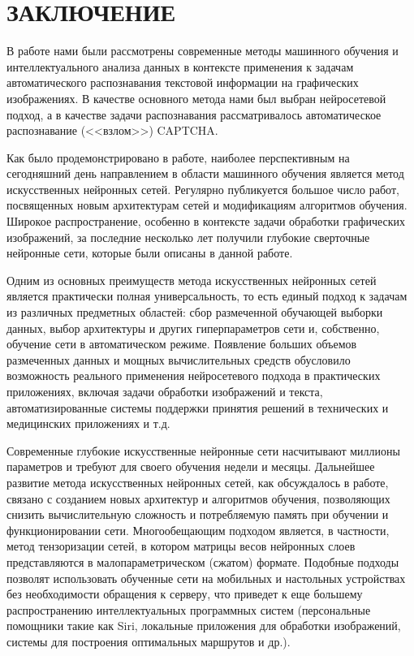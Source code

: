 \documentclass[a4paper,12pt,russian]{article} %
\begin{document}
\newpage
\section*{ЗАКЛЮЧЕНИЕ}

В работе нами были рассмотрены современные методы машинного обучения и интеллектуального анализа данных в контексте применения к задачам автоматического распознавания текстовой информации на графических изображениях.
В качестве основного метода нами был выбран нейросетевой подход, а в качестве задачи распознавания рассматривалось автоматическое распознавание (<<взлом>>) CAPTCHA.

Как было продемонстрировано в работе, наиболее перспективным на сегодняшний день направлением в области машинного обучения является метод искусственных нейронных сетей.
Регулярно публикуется большое число работ, посвященных новым архитектурам сетей и модификациям алгоритмов обучения.
Широкое распространение, особенно в контексте задачи обработки графических изображений, за последние несколько лет получили глубокие сверточные нейронные сети, которые были описаны в данной работе.

Одним из основных преимуществ метода искусственных нейронных сетей является практически полная универсальность, то есть единый подход к задачам из различных предметных областей: сбор размеченной обучающей выборки данных, выбор архитектуры и других гиперпараметров сети и, собственно, обучение сети в автоматическом режиме.
Появление больших объемов размеченных данных и мощных вычислительных средств обусловило возможность реального применения нейросетевого подхода в практических приложениях, включая задачи обработки изображений и текста, автоматизированные системы поддержки принятия решений в технических и медицинских приложениях и т.д.

Современные глубокие искусственные нейронные сети насчитывают миллионы параметров и требуют для своего обучения недели и месяцы.
Дальнейшее развитие метода искусственных нейронных сетей, как обсуждалось в работе, связано с созданием новых архитектур и алгоритмов обучения, позволяющих снизить вычислительную сложность и потребляемую память при обучении и функционировании сети.
Многообещающим подходом является, в частности, метод тензоризации сетей, в котором матрицы весов нейронных слоев представляются в малопараметрическом (сжатом) формате.
Подобные подходы позволят использовать обученные сети на мобильных и настольных устройствах без необходимости обращения к серверу, что приведет к еще большему распространению интеллектуальных программных систем (персональные помощники такие как Siri, локальные приложения для обработки изображений, системы для построения оптимальных маршрутов и др.).
\end{document}
